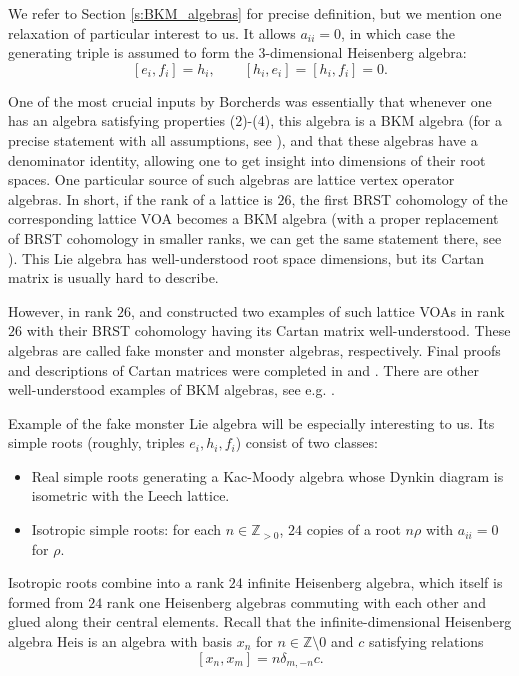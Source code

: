 \documentclass[11pt]{amsart}
\newcommand{\Z}{\mathbb{Z}}
\newcommand{\Heis}{\mathrm{Heis}}
\numberwithin{equation}{section}
\theoremstyle{plain}
\theoremstyle{definition}
\begin{document}
We refer to Section \ref{s:BKM_algebras} for precise definition, but we mention one relaxation of particular interest to us. It allows $a_{ii}=0$, in which case the generating triple is assumed to form the $3$-dimensional Heisenberg algebra:
$$
[e_i,f_i]=h_i,\qquad [h_i,e_i]=[h_i,f_i]=0.
$$

One of the most crucial inputs by Borcherds was essentially that whenever one has an algebra satisfying properties (2)-(4), this algebra is a BKM algebra (for a precise statement with all assumptions, see \cite{Bor88}), and that these algebras have a denominator identity, allowing one to get insight into dimensions of their root spaces. One particular source of such algebras are lattice vertex operator algebras. In short, if the rank of a lattice is $26$, the first BRST cohomology of the corresponding lattice VOA becomes a BKM algebra (with a proper replacement of BRST cohomology in smaller ranks, we can get the same statement there, see \cite{BGGN}). This Lie algebra has well-understood root space dimensions, but its Cartan matrix is usually hard to describe. 

However, in rank $26$, \cite{FLM89} and \cite{Bor90} constructed two examples of such lattice VOAs in rank $26$ with their BRST cohomology having its Cartan matrix well-understood. These algebras are called fake monster and monster algebras, respectively. Final proofs and descriptions of Cartan matrices were completed in \cite{Bor90} and \cite{Bor92}. There are other well-understood examples of BKM algebras, see e.g. \cite{Nie02}.

Example of the fake monster Lie algebra will be especially interesting to us. Its simple roots (roughly, triples $e_i,h_i,f_i$) consist of two classes:
\begin{itemize}
    \item Real simple roots generating a Kac-Moody algebra whose Dynkin diagram is isometric with the Leech lattice.
    \item Isotropic simple roots: for each $n\in\Z_{>0}$, $24$ copies of a root $n\rho$ with $a_{ii}=0$ for $\rho$.
\end{itemize}

Isotropic roots combine into a rank $24$ infinite Heisenberg algebra, which itself is formed from $24$ rank one Heisenberg algebras commuting with each other and glued along their central elements. Recall that the infinite-dimensional Heisenberg algebra $\Heis$ is an algebra with basis $x_n$ for $n\in\Z\setminus 0$ and $c$ satisfying relations
$$
[x_n,x_m]=n\delta_{m,-n}c.
$$
\end{document}
